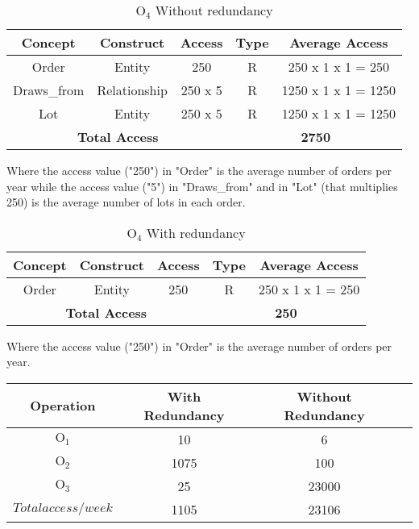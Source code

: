\begin{table}[!h]\caption{	$ \textrm{O}_\textrm{4} $ Without redundancy }
	\begin{center}
		\begin{tabular}{| c | c | c | c | c |}
			\hline
			\textbf{Concept} & \textbf{Construct} & \textbf{Access} & \textbf{Type} & \textbf{Average Access} \\ \hline
			Order & Entity & 250 & R & 250 x 1 x 1 = 250 \\ \hline
			Draws\_from & Relationship & 250 x 5 & R & 1250 x 1 x 1 = 1250 \\ \hline
			Lot & Entity &  250 x 5 & R & 1250 x 1 x 1 = 1250 \\ \hline
			\multicolumn{3}{|c|}{\textbf{Total Access}} & \multicolumn{2}{|c|}{\textbf{2750}} \\ \hline
		\end{tabular}
	\end{center}
\end{table}

Where the access value ("250") in "Order" is the average number of orders per year while the access value ("5") in "Draws\_from" and in "Lot" (that multiplies 250) is the average number of lots in each order.

\begin{table}[!h]\caption{	$ \textrm{O}_\textrm{4} $ With redundancy }
	\begin{center}
		\begin{tabular}{| c | c | c | c | c |}
			\hline
			\textbf{Concept} & \textbf{Construct} & \textbf{Access} & \textbf{Type} & \textbf{Average Access} \\ \hline
			Order & Entity & 250 & R & 250 x 1 x 1 = 250 \\ \hline
			\multicolumn{3}{|c|}{\textbf{Total Access}} & \multicolumn{2}{|c|}{\textbf{250}} \\ \hline
		\end{tabular}
	\end{center}
\end{table}
\newpage

Where the access value ("250") in "Order" is the average number of orders per year.

\begin{table}[!h]
	\begin{center}
		\begin{tabular}{ | c | c | c | c | }
			\hline
			\textbf{Operation} & \textbf{With Redundancy} & \textbf{Without Redundancy} \\ \hline
			$ \textrm{O}_\textrm{1} $ & 10 & 6\\ \hline
			$ \textrm{O}_\textrm{2} $ & 1075 & 100 \\ \hline
			$ \textrm{O}_\textrm{3} $ & 25 & 23000 \\\hline
			$ Total access/week $ & 1105 & 23106 \\\hline
		\end{tabular}
	\end{center}
\end{table}

